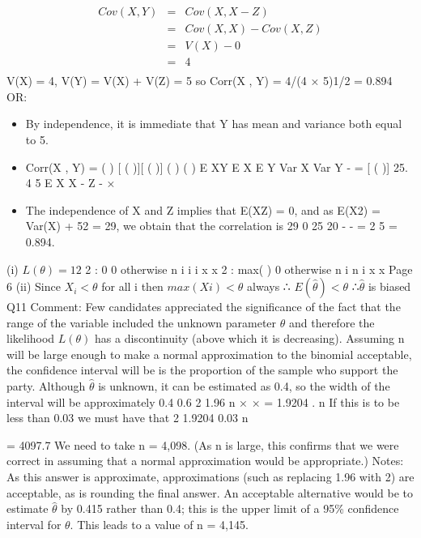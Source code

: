 \documentclass[a4paper,12pt]{article}
\begin{document}
\begin{eqnarray*}
Cov(X , Y) &=& Cov(X , X - Z) \\ &=& Cov(X , X) - Cov(X , Z) \\ &=& V(X) - 0 \\&=& 4\\
\end{eqnarray*}
V(X) = 4, V(Y) = V(X) + V(Z) = 5
so Corr(X , Y) = 4/(4 × 5)1/2 = 0.894
OR:
\begin{itemize}
    \item By independence, it is immediate that Y has mean and variance both equal
to 5.
\item Corr(X , Y) =
( ) [ ( )][ ( )]
( ) ( )
E XY E X E Y
Var X Var Y
- =
[ ( )] 25.
4 5
E X X - Z -
×
\item The independence of X and Z implies that E(XZ) = 0, and as E(X2) = Var(X) + 52 = 29, we obtain that the correlation is
29 0 25
20
- - =
2
5
= 0.894.
\end{itemize}
 (i) $L(\theta) = 1 2$
2
: 0
0 otherwise
n
i
i i
x
x
2
: max( )
0 otherwise
n
i
n i
x
x
Page 6
(ii) Since $X_i < \theta$ for all i
then $max(Xi) < \theta$ always
∴ $E( \hat{\theta}) < \theta$ ∴$\hat{\theta}$ is biased
Q11 Comment: Few candidates appreciated the significance of the fact that the range of the variable included the unknown parameter $\theta$ and therefore the likelihood $L(\theta)$ has a discontinuity (above which it is decreasing).
 Assuming n will be large enough to make a normal approximation to the
binomial acceptable, the confidence interval will be
is the proportion of the sample who support the party.
Although $\hat{\theta}$ is unknown, it can be estimated as 0.4, so the width of the interval will be approximately
0.4 0.6
2 1.96
n
× × =
1.9204
.
n
If this is to be less than 0.03 we must have that
2 1.9204
0.03
n

= 4097.7
We need to take n = 4,098.
(As n is large, this confirms that we were correct in assuming that a normal
approximation would be appropriate.)
Notes: As this answer is approximate, approximations (such as replacing 1.96
with 2) are acceptable, as is rounding the final answer.
An acceptable alternative would be to estimate $\hat{\theta}$ by 0.415 rather than 0.4; this
is the upper limit of a 95\% confidence interval for $\theta$. This leads to a value of
n = 4,145.
\end{document}
